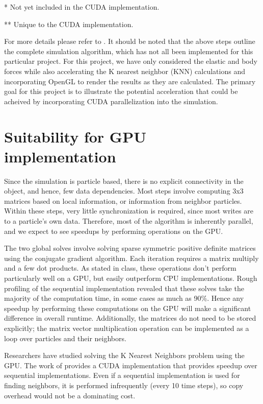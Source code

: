 \documentclass[cameraready]{acmsiggraph-awb}
\begin{document}
* Not yet included in the CUDA implementation.

** Unique to the CUDA implementation.

For more details please refer to \cite{us}.
It should be noted that the above steps outline the complete simulation algorithm, which has not all been implemented for this particular project.
For this project, we have only considered the elastic and body forces while also accelerating the K nearest neighbor (KNN) calculations and incorporating OpenGL to render the results as they are calculated.
The primary goal for this project is to illustrate the potential acceleration that could be acheived by incorporating CUDA parallelization into the simulation.


\section{Suitability for GPU implementation}

Since the simulation is particle based, there is no explicit connectivity in the object, and hence, few data dependencies.  
Most steps involve computing 3x3 matrices based on local information, or information from neighbor particles.  
Within these steps, very little synchronization is required, since most writes are to a particle's own data. 
Therefore, most of the algorithm is inherently parallel, and we expect to see speedups by performing operations on the GPU.  

The two global solves involve solving sparse symmetric positive definite matrices using the conjugate gradient algorithm.  Each iteration requires a matrix multiply and a few dot products.  As stated in class, these operations don't perform particularly well on a GPU, but easily outperform CPU implementations.  Rough profiling of the sequential implementation revealed that these solves take the majority of the computation time, in some cases as much as 90\%.   Hence any speedup by performing these computations on the GPU will make a significant difference in overall runtime.  Additionally, the matrices do not need to be stored explicitly; the matrix vector multiplication operation can be implemented as a loop over particles and their neighbors.  

Researchers have studied solving the K Nearest Neighbors problem using the GPU.   The work of \cite{Garcia_2008_CVGPU} provides a CUDA implementation that provides speedup over sequential implementations.  Even if a sequential implementation is used for finding neighbors, it is performed infrequently (every 10 time steps), so copy overhead would not be a dominating cost.  
\end{document}
